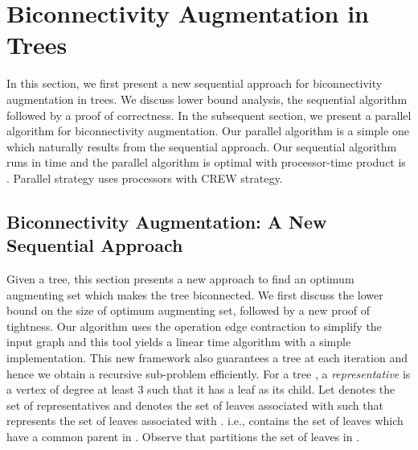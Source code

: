 \documentclass[runningheads]{llncs}
\begin{document}
\section{Biconnectivity Augmentation in Trees}
\label{treeaugment}
In this section, we first present a new sequential approach for biconnectivity augmentation in trees.  We discuss lower bound analysis, the sequential algorithm followed by a proof of correctness.  In the subsequent section, we present a parallel algorithm for biconnectivity augmentation.  Our parallel algorithm is a simple one which naturally results from the sequential approach.  Our sequential algorithm runs in  time and the parallel algorithm is optimal with processor-time product is .   Parallel strategy uses  processors with CREW strategy.
\subsection{Biconnectivity Augmentation: A New Sequential Approach}
Given a tree, this section presents a new approach to find an optimum augmenting set which makes the tree biconnected.  We first discuss the lower bound on the size of optimum augmenting set, followed by a new proof of tightness.  Our algorithm uses the operation edge contraction to simplify the input graph and this tool yields a linear time algorithm with a simple implementation. 
This new framework also guarantees a tree at each iteration and hence we obtain a recursive sub-problem efficiently.  For a tree , a {\em representative} is a vertex of degree at least 3 such that it has a leaf as its child.  Let  denotes the set of representatives and  denotes the set of leaves associated with  such that  represents the set of leaves associated with .  i.e.,  contains the set of leaves which have a common parent in . Observe that  partitions the set of leaves in .
\end{document}
